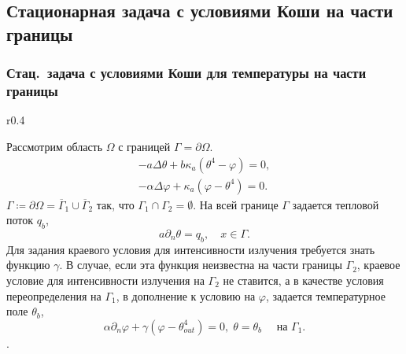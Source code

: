 \subsection{Стационарная задача с условиями Коши на части границы}\label{subsec:st-koshi}
\begin{frame}
    \frametitle{Стац.\ задача с условиями Коши для температуры на части границы}
    \begin{wrapfigure}{r}{0.4\textwidth}
    \end{wrapfigure}
    Рассмотрим область $\Omega$ с границей $\Gamma=\partial\Omega$.
    \begin{gather}
        \label{eq:2_4:eq1}
        - a\Delta\theta + b\kappa_a(\theta^4 - \varphi) = 0,   \\
        -\alpha \Delta \varphi + \kappa_a(\varphi- \theta^4) = 0.
    \end{gather}
    $\Gamma \coloneqq \partial \Omega =\overline{\Gamma}_1 \cup \overline{\Gamma}_2$
    так, что $\Gamma_1 \cap \Gamma_2 =  \emptyset$.
    На всей границе $\Gamma$ задается тепловой поток $q_b$,
    \begin{equation}
        \label{eq:2_4:bc1}
        a\partial_n\theta = q_b, \quad x\in \Gamma.
    \end{equation}
    Для задания краевого условия для интенсивности излучения требуется знать функцию $\gamma$.
    В случае, если эта функция неизвестна на части границы $\Gamma_2$,
    краевое условие для интенсивности излучения на $\Gamma_2$ не ставится, а в качестве условия
    переопределения на $\Gamma_1$, в дополнение к условию на
    $\varphi$, задается температурное поле $\theta_b$,
    \begin{equation}
        \label{eq:2_4:bc2}
        \alpha\partial_n\varphi + \gamma (\varphi - \theta_{out} ^4 ) = 0,\;
        \theta=\theta_b\quad \text{ на } \Gamma_1.
    \end{equation}.

\end{frame}

